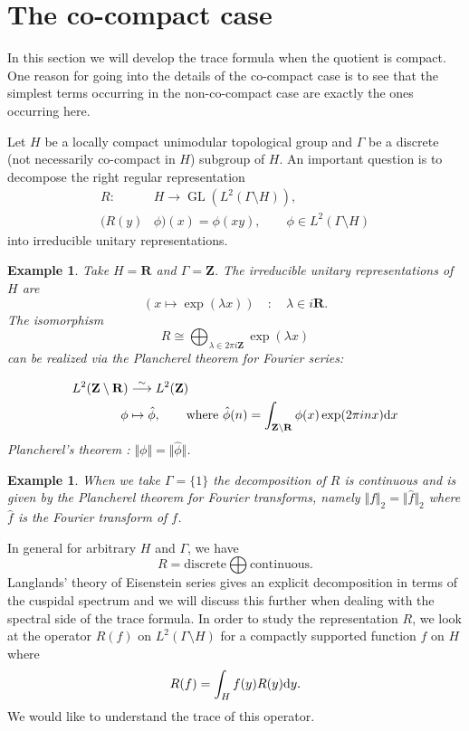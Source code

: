 \documentclass[11pt]{amsart}
\def\R{\mathbf R}
\def\Z{\mathbf Z}
\def\d{\text d}
\def\bs{\setminus} 			%
\def\gl{\operatorname{GL}}
\def\Ltwo{L^2}
\def\norm#1{\Vert #1 \Vert} %
\newtheorem{example}[theorem]{Example}
\theoremstyle{remark}
\begin{document}
\section{The co-compact case} \label{sec_cpt}

In this section we will develop the trace formula when the quotient is compact. One reason for going into the details of the co-compact case is to see that the simplest terms occurring in the non-co-compact case are exactly the ones occurring here. 

Let $H$ be a locally compact unimodular topological group and $\Gamma$ be a discrete (not necessarily co-compact in $H$) subgroup of $H$. An important question is to decompose the right regular representation 
\begin{align*}
	R : & H \to \gl(\Ltwo(\Gamma \bs H)), \\
	(R(y) & \phi)(x) = \phi(xy), \qquad \phi \in \Ltwo(\Gamma\bs H)
\end{align*}
into irreducible unitary representations. 
\begin{example}
	Take $H = \R$ and $\Gamma = \Z$. The irreducible unitary representations of $H$ are 
	\[ (x \mapsto \exp(\lambda x)) \quad : \quad \lambda \in i\R. \]
	The isomorphism 
	\[ R \cong \displaystyle\bigoplus_{\lambda \in 2\pi i \Z} \exp(\lambda x) \]
	can be realized via the Plancherel theorem for Fourier series:
	
	\begin{align*}
		\Ltwo(\Z \bs \R) & \overset{\sim}{\longrightarrow} \Ltwo(\Z) \\
		\phi & \mapsto \hat\phi, \qquad \text{where }\hat\phi(n) = \int_{\Z\bs \R} \phi(x) \exp(2\pi i n x) \d x
	\end{align*}
	Plancherel's theorem : $\norm{\phi} = \norm{\hat\phi}$. 
\end{example}

\begin{example}
	When we take $\Gamma = \{1\}$ the decomposition of $R$ is continuous and is given by the Plancherel theorem for Fourier transforms, namely $\norm{f}_2 = \norm{\hat f}_2$ where $\hat f$ is the Fourier transform of $f$. 
\end{example}

In general for arbitrary $H$ and $\Gamma$, we have 
\[ R = \text{discrete} \bigoplus \text{continuous}. \]
Langlands' theory of Eisenstein series gives an explicit decomposition in terms of the cuspidal spectrum and we will discuss this further when dealing with the spectral side of the trace formula. In order to study the representation $R$, we look at the operator $R(f)$ on $\Ltwo(\Gamma\bs H)$ for a compactly supported function $f$ on $H$ where
\[ R(f) = \int_H f(y) R(y) \d y. \]
We would like to understand the trace of this operator. 
\end{document}
